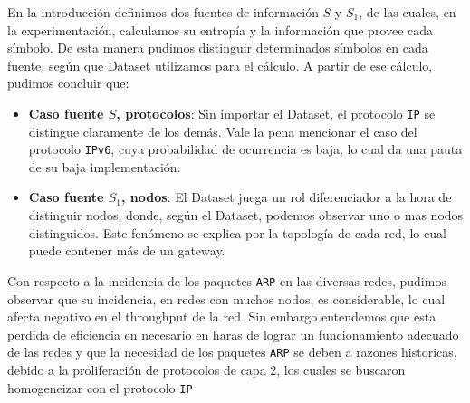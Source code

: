 En la introducción definimos dos fuentes de información $S$ y $S_{1}$, de las cuales, en la experimentación, calculamos su entropía y la información que provee cada símbolo. De esta manera pudimos distinguir determinados símbolos en cada fuente, según que Dataset utilizamos para el cálculo. A partir de ese cálculo, pudimos concluir que:
\begin{itemize}
  \item \textbf{Caso fuente $S$, protocolos}: Sin importar el Dataset, el protocolo \texttt{IP} se distingue claramente de los demás. Vale la pena mencionar el caso del protocolo \texttt{IPv6}, cuya probabilidad de ocurrencia es baja, lo cual da una pauta de su baja implementación.
  \item \textbf{Caso fuente $S_{1}$, nodos}: El Dataset juega un rol diferenciador a la hora de distinguir nodos, donde, según el Dataset, podemos observar uno o mas nodos distinguidos. Este fenómeno se explica por la topología de cada red, lo cual puede contener más de un gateway.
\end{itemize}

Con respecto a la incidencia de los paquetes \texttt{ARP} en las diversas redes, pudimos observar que su incidencia, en redes con muchos nodos, es considerable, lo cual afecta negativo en el throughput de la red. Sin embargo entendemos que esta perdida de eficiencia en necesario en haras de lograr un funcionamiento adecuado de las redes y que la necesidad de los paquetes \texttt{ARP} se deben a razones historicas, debido a la proliferación de protocolos de capa 2, los cuales se buscaron homogeneizar con el protocolo \texttt{IP}
